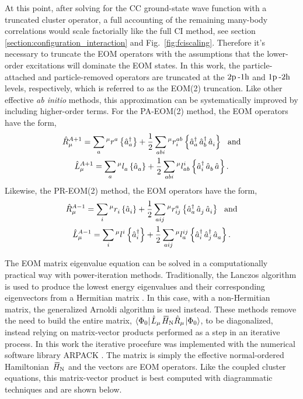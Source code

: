 \documentclass[thesis.tex]{subfiles}
\begin{document}
At this point, after solving for the CC ground-state wave function with a truncated cluster operator, a full accounting of the remaining many-body correlations would scale factorially like the full CI method, see section \ref{section:configuration_interaction} and Fig.\ \ref{fig:fciscaling}.  Therefore it's necessary to truncate the EOM operators with the assumptions that the lower-order excitations will dominate the EOM states.  In this work, the particle-attached and particle-removed operators are truncated at the $2\mathrm{p}\hspace{2pt}\text{-}1\mathrm{h}$ and $1\mathrm{p}\hspace{2pt}\text{-}2\mathrm{h}$ levels, respectively, which is referred to as the EOM(2) truncation.  Like other effective \emph{ab initio} methods, this approximation can be systematically improved by including higher-order terms.  For the PA-EOM(2) method, the EOM operators have the form, 
\begin{gather} \label{eq:pa-eom2}
  \Rop^{A+1}_{\mu} = \sum_{a}\rint{\mu}{a}{}\normord{\co{a}} + \frac{1}{2}\sum_{abi}\rint{\mu}{ab}{i}\normord{\co{a}\co{b}\ao{i}} \ \ \text{and} \notag \\
  \Lop^{A+1}_{\mu} = \sum_{a}\lint{\mu}{}{a}\normord{\ao{a}} + \frac{1}{2}\sum_{abi}\lint{\mu}{i}{ab}\normord{\co{i}\ao{b}\ao{}}.
\end{gather}
Likewise, the PR-EOM(2) method, the EOM operators have the form,
\begin{gather} \label{eq:pr-eom2}
  \Rop^{A-1}_{\mu} = \sum_{i}\rint{\mu}{}{i}\normord{\ao{i}} + \frac{1}{2}\sum_{aij}\rint{\mu}{a}{ij}\normord{\co{a}\ao{j}\ao{i}} \ \ \text{and} \notag \\
  \Lop^{A-1}_{\mu} = \sum_{i}\lint{\mu}{i}{}\normord{\co{i}} + \frac{1}{2}\sum_{aij}\lint{\mu}{ij}{a}\normord{\co{i}\co{j}\ao{a}}.
\end{gather}

The EOM matrix eigenvalue equation can be solved in a computationally practical way with power-iteration methods.  Traditionally, the Lanczos algorithm is used to produce the lowest energy eigenvalues and their corresponding eigenvectors from a Hermitian matrix \cite{LANCZOS1950}.  In this case, with a non-Hermitian matrix, the generalized Arnoldi algorithm \cite{ARNOLDI1951} is used instead.  These methods remove the need to build the entire matrix, $\element{\Ref}{\Lop_{\mu}\EHamN\Rop_{\mu}}{\Ref}$, to be diagonalized, instead relying on matrix-vector products performed as a step in an iterative process.  In this work the iterative procefure was implemented with the numerical software library ARPACK \cite{ARPACK1998}.  The matrix is simply the effective normal-ordered Hamiltonian $\EHamN$ and the vectors are EOM operators.  Like the coupled cluster equations, this matrix-vector product is best computed with diagrammatic techniques and are shown below.
\end{document}
